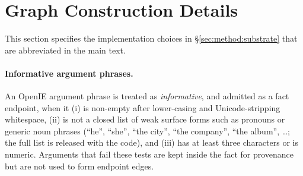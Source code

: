 \begin{table}[h]
\centering
\scriptsize
\setlength{\tabcolsep}{3pt}
\caption{Online operational statistics for \methodname{} on
1{,}000-query runs. Pool is the native candidate pool size before
evidence-aware readout. Edited is the fraction of examples whose final
top-five prefix differs from the local propagation prefix. Local docs
and local edges are averages over the query-local graph before the
final top-five readout. Flow iters reports the average number of local
evidence-flow updates recorded by the retrieval trace.}
\label{tab:online-operational-stats}
\end{table}

\section{Graph Construction Details}
\label{app:graph-details}

This section specifies the implementation choices in
\S\ref{sec:method:substrate} that are abbreviated in the main text.

\paragraph{Informative argument phrases.}
An OpenIE argument phrase is treated as \emph{informative}, and
admitted as a fact endpoint, when it (i) is non-empty after
lower-casing and Unicode-stripping whitespace, (ii) is not a closed
list of weak surface forms such as pronouns or generic noun phrases
(``he'', ``she'', ``the city'', ``the company'', ``the album'',
\ldots; the full list is released with the code), and (iii) has at
least three characters or is numeric. Arguments that fail these
tests are kept inside the fact for provenance but are not used to
form endpoint edges.

